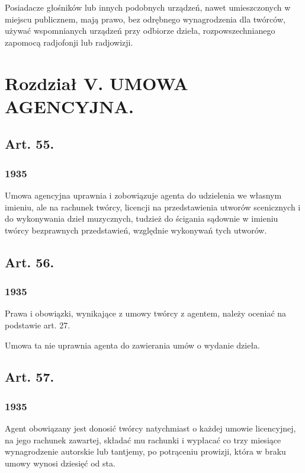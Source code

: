 \documentclass[withmarginpar]{book}
\begin{document}
Posiadacze głośników lub innych podobnych urządzeń, nawet
umieszczonych w miejscu publicznem, mają prawo, bez odrębnego
wynagrodzenia dla twórców, używać wspomnianych urządzeń przy odbiorze
dzieła, rozpowszechnianego zapomocą radjofonji lub radjowizji.

\chapter{Rozdział   V. UMOWA AGENCYJNA.}
\label{cha:r-o-z-3}

\section{Art. 55.}
\label{sec:art.-55}
\subsection{1935}
\label{sec:art.-55-1}

Umowa agencyjna uprawnia i zobowiązuje agenta do udzielenia we własnym
imieniu, ale na rachunek twórcy, licencji na przedstawienia utworów
scenicznych i do wykonywania dzieł muzycznych, tudzież do ścigania
sądownie w imieniu twórcy bezprawnych przedstawień, względnie
wykonywań tych utworów.

\section{Art. 56.}
\label{sec:art.-56}
\subsection{1935}
\label{sec:art.-56-1}

Prawa i obowiązki, wynikające z umowy twórcy z agentem, należy oceniać
na podstawie art. 27.

Umowa ta nie uprawnia agenta do zawierania umów o wydanie dzieła.


\section{Art. 57.}
\label{sec:art.-57}
\subsection{1935}
\label{sec:art.-57-1}

Agent obowiązany jest donosić twórcy natychmiast o każdej umowie
licencyjnej, na jego rachunek zawartej, składać mu rachunki i wypłacać
co trzy miesiące wynagrodzenie autorskie lub tantjemy, po potrąceniu
prowizji, która w braku umowy wynosi dziesięć od sta.
\end{document}
